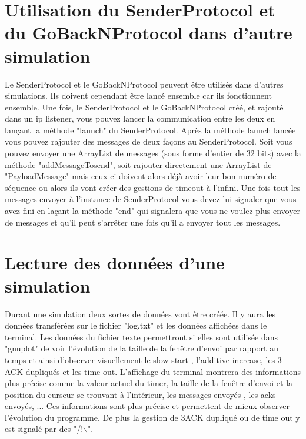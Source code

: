 \documentclass[a4paper,10pt]{article}
\begin{document}
\section{Utilisation du SenderProtocol et du GoBackNProtocol dans d'autre simulation}
Le SenderProtocol et le GoBackNProtocol peuvent être utilisés dans d'autres simulations. Ils doivent cependant être lancé ensemble car ils fonctionnent ensemble. Une fois, le SenderProtocol et le GoBackNProtocol créé, et rajouté dans un ip listener, vous pouvez lancer la communication entre les deux en lançant la méthode "launch" du SenderProtocol. Après la méthode launch lancée vous pouvez rajouter des messages de deux façons au SenderProtocol. Soit vous pouvez envoyer  une ArrayList de messages (sous forme d'entier de 32 bits) avec la méthode "addMessageTosend", soit rajouter directement une ArrayList de "PayloadMessage" mais ceux-ci doivent alors déjà avoir leur bon numéro de séquence ou alors ils vont créer des gestions de timeout à l'infini. Une fois tout les messages envoyer à l'instance de SenderProtocol vous devez lui signaler que vous avez fini en laçant la méthode "end" qui signalera que vous ne voulez plus envoyer de messages et qu'il peut s'arrêter une fois qu'il a envoyer tout les messages.\\

\section{Lecture des données d'une simulation}
Durant une simulation deux sortes de données vont être créée. Il y aura les données transférées sur le fichier "log.txt" et les données affichées dans le terminal. Les données du fichier texte permettront si elles sont utilisée dans "gnuplot" de voir l'évolution de la taille de la fenêtre d'envoi par rapport au temps et ainsi d'observer visuellement le slow start , l'additive increase, les 3 ACK dupliqués et les time out. L'affichage du terminal montrera des informations plus précise comme la valeur actuel du timer, la taille de la fenêtre d'envoi et la position du curseur se trouvant à l'intérieur, les messages envoyés , les acks envoyés, ... Ces informations sont plus précise et permettent de mieux observer l'évolution du programme. De plus la gestion de 3ACK dupliqué ou de time out y est signalé par des "/!$\backslash$".\\
\end{document}
